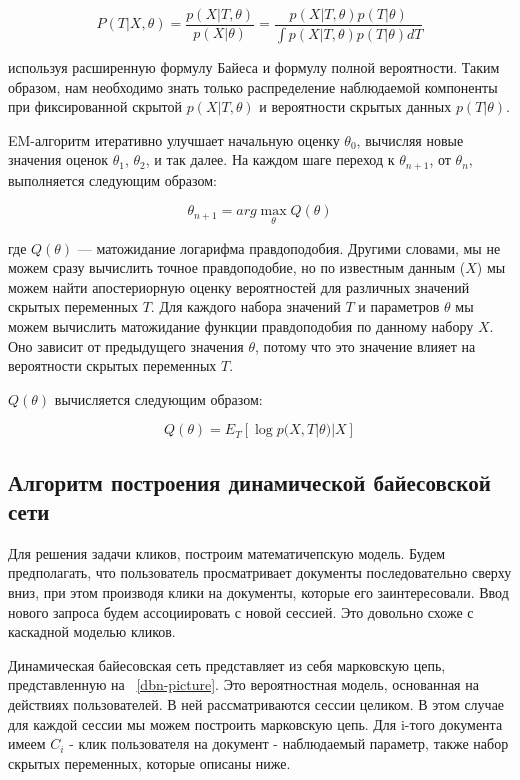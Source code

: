 \begin{equation}
	P(T|X,\theta)=\frac{p(X|T,\theta)}{p(X|\theta)}=\frac{p(X|T,\theta)p(T|\theta)}{\int p(X|T,\theta)p(T|\theta)dT}
\end{equation}

используя расширенную формулу Байеса и формулу полной вероятности. Таким образом, нам необходимо знать только распределение наблюдаемой компоненты при фиксированной скрытой $p(X|T,\theta)$ и вероятности скрытых данных $p(T|\theta)$.

EM-алгоритм итеративно улучшает начальную оценку $\theta_0$, вычисляя новые значения оценок $\theta_1$, $\theta_2$, и так далее. На каждом шаге переход к $\theta_{n+1}$, от $\theta_n$, выполняется следующим образом:

\begin{equation}
	\theta_{n+1}=arg \max_{\theta} Q(\theta)
\end{equation}

где $Q(\theta)$ — матожидание логарифма правдоподобия. Другими словами, мы не можем сразу вычислить точное правдоподобие, но по известным данным ($X$) мы можем найти апостериорную оценку вероятностей для различных значений скрытых переменных $T$. Для каждого набора значений $T$ и параметров $\theta$ мы можем вычислить матожидание функции правдоподобия по данному набору $X$. Оно зависит от предыдущего значения $\theta$, потому что это значение влияет на вероятности скрытых переменных $T$.

$Q(\theta)$ вычисляется следующим образом:

\begin{equation}
	Q(\theta) = E_T[\log p(X,T|\theta)|X]
\end{equation}


\subsection{Алгоритм построения динамической байесовской сети}

Для решения задачи кликов, построим математичепскую модель. Будем предполагать, что пользователь просматривает документы последовательно сверху вниз, при этом производя клики на документы, которые его заинтересовали. Ввод нового запроса будем ассоциировать с новой сессией. Это довольно схоже с каскадной моделью кликов.~\cite{cascade_click_book}

Динамическая байесовская сеть представляет из себя марковскую цепь, представленную на ~\ref{dbn-picture}. Это вероятностная модель, основанная на действиях пользователей. В ней рассматриваются сессии целиком. В этом случае для каждой сессии мы можем построить марковскую цепь. Для i-того документа имеем $C_i$ - клик пользователя на документ - наблюдаемый параметр, также набор скрытых переменных, которые описаны ниже.	

